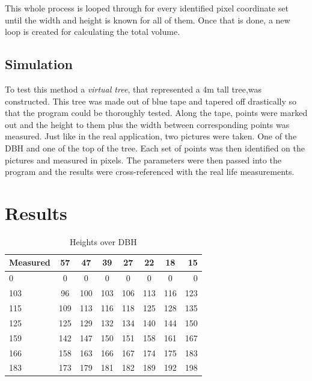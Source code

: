This whole process is looped through for every identified pixel coordinate set until the width and height is known for all of them. Once that is done, a new loop is created for calculating the total volume.

\subsection{Simulation}
To test this method a \emph{virtual tree}, that represented a 4m tall tree,was constructed. This tree was made out of blue tape and tapered off drastically so that the program could be thoroughly tested. Along the tape, points were marked out and the height to them plus the width between corresponding points was measured. Just like in the real application, two pictures were taken. One of the DBH and one of the top of the tree. Each set of points was then identified on the pictures and measured in pixels. The parameters were then passed into the program and the results were cross-referenced with the real life measurements.

\newpage

\section{Results}
\begin{table}[h!]
	\begin{center}
		\begin{tabular}{| l c c c c c c r |}		
		\hline
		Measured & 57\degree & 47\degree & 39\degree & 27\degree & 22\degree & 18\degree & 15\degree \\
		\hline
		0 		& 0 	& 0 	& 0 	& 0 	& 0 	& 0 	& 0 	\\
		103 	& 96 	& 100 	& 103 	& 106 	& 113 	& 116 	& 123 	\\
		115 	& 109 	& 113 	& 116 	& 118 	& 125 	& 128 	& 135 	\\
		125 	& 125 	& 129	& 132 	& 134 	& 140 	& 144 	& 150 	\\
		159 	& 142 	& 147 	& 150 	& 151 	& 158 	& 161 	& 167 	\\
		166 	& 158 	& 163 	& 166 	& 167 	& 174 	& 175 	& 183 	\\
		183 	& 173 	& 179 	& 181	& 182 	& 189 	& 192 	& 198 	\\
		\hline
		\end{tabular}
		\caption{Heights over DBH}
		\label{heights}
	\end{center}
\end{table}

